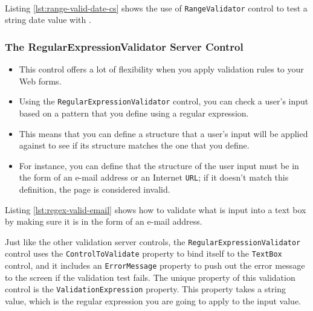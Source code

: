 


\paragraph*{\cs}
Listing \ref{lst:range-valid-date-cs} shows the use of \texttt{RangeValidator} control to test a string date value with \cs.


\subsubsection{The RegularExpressionValidator Server Control}
\begin{itemize}
	\item This control offers a lot of flexibility when you apply validation rules to your Web forms. 
	\item Using the	\texttt{RegularExpressionValidator} control, you can check a user’s input based on a pattern that you define
	using a regular expression.
	\item This means that you can define a structure that a user’s input will be applied against to see if its structure matches the one that you define. \item For instance, you can define that the structure of the user input must be in the form of an e-mail address or an Internet \texttt{URL}; if it doesn't match this definition, the page
	is considered invalid.
\end{itemize}

Listing {\ref{lst:regex-valid-email}} shows how to validate what is input into a text box by making sure it is in the form of an e-mail address.



Just like the other validation server controls, the \texttt{RegularExpressionValidator} control uses the
\texttt{ControlToValidate} property to bind itself to the \texttt{TextBox} control, and it includes an \texttt{ErrorMessage}
property to push out the error message to the screen if the validation test fails. The unique property of
this validation control is the \texttt{ValidationExpression} property. This property takes a string value,
which is the regular expression you are going to apply to the input value.

